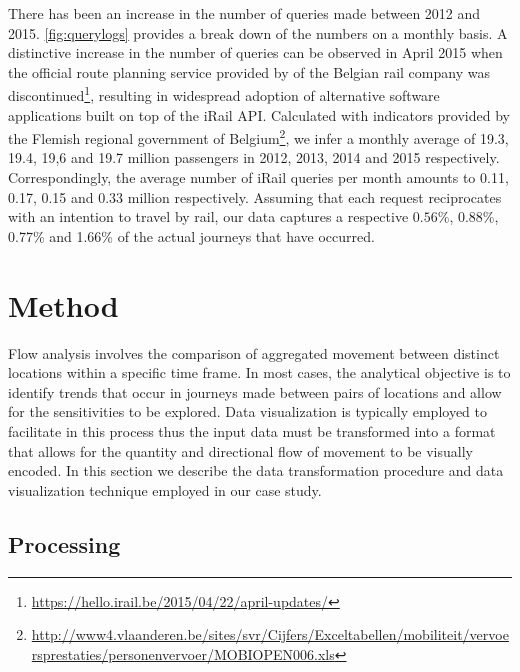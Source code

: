 \documentclass{sig-alternate}
\begin{document}
There has been an increase in the number of queries made between 2012 and 2015. 
\cref{fig:querylogs} provides a break down of the numbers on a monthly basis. 
A distinctive increase in the number of queries can be observed in April 2015 when the official route planning service provided by of the Belgian rail company was discontinued\footnote{\url{https://hello.irail.be/2015/04/22/april-updates/}}, resulting in widespread adoption of alternative software applications built on top of the iRail API.
Calculated with indicators provided by the Flemish regional government of Belgium\footnote{\url{http://www4.vlaanderen.be/sites/svr/Cijfers/Exceltabellen/mobiliteit/vervoersprestaties/personenvervoer/MOBIOPEN006.xls}}, we infer a monthly average of 19.3, 19.4, 19,6 and 19.7 million passengers in 2012, 2013, 2014 and 2015 respectively. 
Correspondingly, the average number of iRail queries per month amounts to 0.11, 0.17, 0.15 and 0.33 million respectively.
Assuming that each request reciprocates with an intention to travel by rail, our data captures a respective $0.56\%$, 0.88\%, 0.77\% and 1.66\% of the actual journeys that have occurred.


\section{Method}
\label{sec:method}

Flow analysis involves the comparison of aggregated movement between distinct locations within a specific time frame. 
In most cases, the analytical objective is to identify trends that occur in journeys made between pairs of locations and allow for the sensitivities to be explored. 
Data visualization is typically employed to facilitate in this process thus the input data must be transformed into a format that allows for the quantity and directional flow of movement to be visually encoded.
In this section we describe the data transformation procedure and data visualization technique employed in our case study.

\subsection{Processing}
\end{document}
